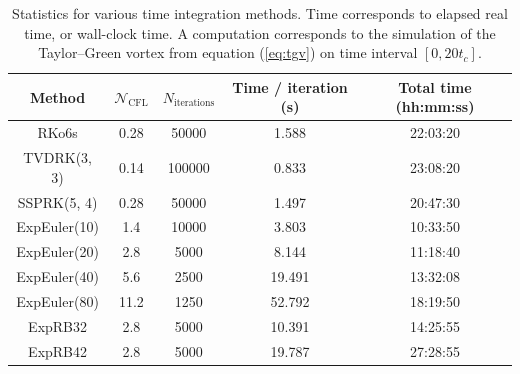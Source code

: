       \begin{figure}
        \centering
        \caption{}
        \label{fig:tgv_curves}
      \end{figure}

      \begin{table}
        \center
        \begin{tabular}{c|cccc}
          Method       & $\mathcal{N}_\textrm{CFL}$ & $N_\textrm{iterations}$ & Time / iteration (s) & Total time (hh:mm:ss) \\ \hline
          RKo6s        & 0.28                       &                   50000 &                1.588 &             22:03:20  \\
          TVDRK(3, 3)  & 0.14                       &                  100000 &                0.833 &             23:08:20  \\
          SSPRK(5, 4)  & 0.28                       &                   50000 &                1.497 &             20:47:30  \\ \hline
          ExpEuler(10) & 1.4                        &                   10000 &                3.803 &             10:33:50  \\
          ExpEuler(20) & 2.8                        &                    5000 &                8.144 &             11:18:40  \\
          ExpEuler(40) & 5.6                        &                    2500 &               19.491 &             13:32:08  \\
          ExpEuler(80) & 11.2                       &                    1250 &               52.792 &             18:19:50  \\
          ExpRB32      & 2.8                        &                    5000 &               10.391 &             14:25:55  \\
          ExpRB42      & 2.8                        &                    5000 &               19.787 &             27:28:55  \\
        \end{tabular}
        \caption{
          Statistics for various time integration methods.
          Time corresponds to elapsed real time, or wall-clock time.
          A computation corresponds to the simulation of the Taylor--Green vortex from equation (\ref{eq:tgv}) on time interval $\left[0, 20 t_c\right]$.}\label{tab:tgv}
      \end{table}

